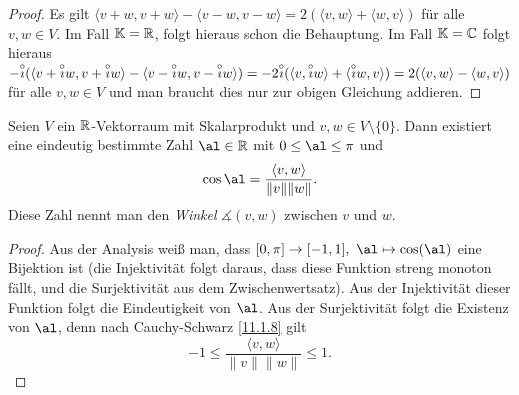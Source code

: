 \documentclass[../../main.tex]{subfiles}
\begin{document}
\begin{proof}
Es gilt $\langle v+w,v+w\rangle-\langle v-w,v-w\rangle=2(\langle v,w\rangle+\langle w,v\rangle)$ für alle $v,w\in V$. Im Fall $\mathbb K=\mathbb R$, folgt hieraus schon die Behauptung.
Im Fall $\mathbb K=\mathbb C$ folgt hieraus
$-\overset\circ\imath(\langle v+\overset\circ\imath w,v+\overset\circ\imath w\rangle-\langle v-\overset\circ\imath w,v-\overset\circ\imath w\rangle)=-2\overset\circ\imath(\langle v,\overset\circ\imath w\rangle+\langle\overset\circ\imath w,v\rangle)=2(\langle v,w\rangle-\langle w,v\rangle)$ für alle $v,w\in V$ und man
braucht dies nur zur obigen Gleichung addieren.
\end{proof}

\begin{defprop}\label{11.1.11}
Seien $V$ ein $\mathbb R$-Vektorraum mit Skalarprodukt und $v,w\in V\setminus\{0\}$. Dann existiert eine eindeutig bestimmte Zahl  $\al\in\R$ mit $0\le\al\le\pi$ und
\[\cos\al=\frac{\langle v,w\rangle}{\|v\|\|w\|}.\]
Diese Zahl nennt man den \emph{Winkel} $\measuredangle(v,w)$ zwischen $v$ und $w$.
\end{defprop}

\begin{proof}
Aus der Analysis weiß man, dass $[0,\pi]\to[-1,1],\ \al\mapsto\cos(\al)$ eine Bijektion ist (die Injektivität folgt daraus, dass diese Funktion streng monoton fällt, und die Surjektivität
aus dem Zwischenwertsatz). Aus der Injektivität dieser Funktion folgt die Eindeutigkeit von $\al$. Aus der Surjektivität folgt die Existenz von $\al$, denn nach Cauchy-Schwarz
\ref{11.1.8} gilt
\[-1\le\frac{\langle v,w\rangle}{\|v\|\|w\|}\le1.\]
\end{proof}
\end{document}
